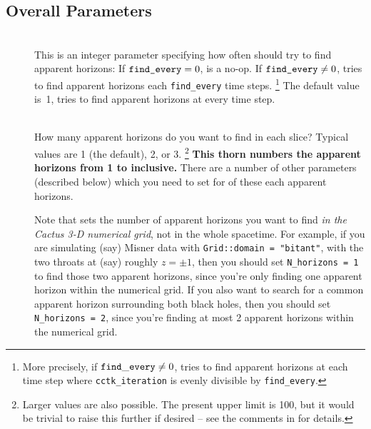 
\subsection{Overall Parameters}
\label{AHFinderDirect/sect-parameters/overall-parameters}

\begin{description}
\item[]
\mbox{}\\
	This is an integer parameter specifying how often
	 should try to find apparent horizons:
	If $\verb|find_every| = 0$,  is a no-op.
	If $\verb|find_every| \ne 0$,  tries to
	find apparent horizons each \verb|find_every| time steps.%
\footnote{%
	 More precisely, if ${\tt find\_every} \ne 0$,
	  tries to find apparent
	 horizons at each time step where {\tt cctk\_iteration}
	 is evenly divisible by {\tt find\_every}.
	 }%
{}	The default value is~1, \ie{}  tries
	to find apparent horizons at every time step.
\item[]
\mbox{}\\
	How many apparent horizons do you want to find in each slice?
	Typical values are 1 (the default), 2, or 3.%
\footnote{%
	 Larger values are also possible.  The present upper
	 limit is 100, but it would be trivial to raise this
	 further if desired -- see the comments in 
	 for details.
	 }%
{}	{\bf This thorn numbers the apparent horizons from 1 to
	 inclusive.}
	There are a number of other parameters (described below)
	which you need to set for of these each apparent horizons.

	Note that  sets the number of apparent horizons
	you want to find {\em in the Cactus 3-D numerical grid\/}, not in
	the whole spacetime.  For example, if you are simulating (say)
	Misner data with \verb|Grid::domain = "bitant"|, with the two
	throats at (say) roughly $z = \pm 1$, then you should set
	\verb|N_horizons = 1| to find those two apparent horizons,
	since you're only finding one apparent horizon within the
	numerical grid.  If you also want to search for a common
	apparent horizon surrounding both black holes, then you should
	set \verb|N_horizons = 2|, since you're finding at most 2
	apparent horizons within the numerical grid.


\end{description}
